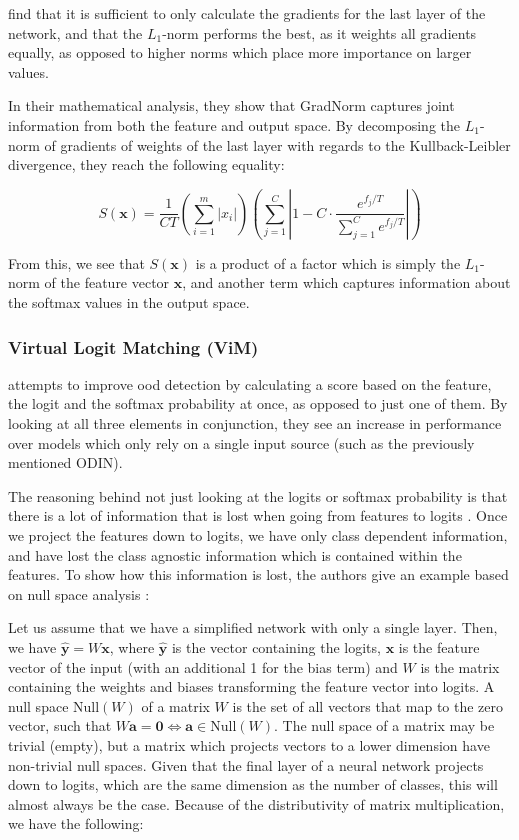 \documentclass[UKenglish]{uiomasterthesis} %
\theoremstyle{definition}
\begin{document}
\cite{gradnorm} find that it is sufficient to only calculate the gradients for the last layer of the network, and that the $L_1$-norm performs the best, as it weights all gradients equally, as opposed to higher norms which place more importance on larger values.

In their mathematical analysis, they show that GradNorm captures joint information from both the feature and output space. By decomposing the $L_1$-norm of gradients of weights of the last layer with regards to the Kullback-Leibler divergence, they reach the following equality:

\begin{equation}
S(\bm{x}) = \frac{1}{CT}  \left(\sum_{i=1}^m |x_i|\right) \left(\sum_{j=1}^C \left|1 - C \cdot \frac{e^{f_j / T}}{\sum_{j=1}^C e^{{f_{j}} / T}}\right|\right)
\label{eq:decomp}
\end{equation}

From this, we see that $S(\bm{x})$ is a product of a factor which is simply the $L_1$-norm of the feature vector $\bm{x}$, and another term which captures information about the softmax values in the output space.
\\


\subsubsection{Virtual Logit Matching (ViM)} \label{section:vim}

\cite{vim} attempts to improve \ac{ood} detection by calculating a score based on the feature, the logit and the softmax probability at once, as opposed to just one of them. By looking at all three elements in conjunction, they see an increase in performance over models which only rely on a single input source (such as the previously mentioned ODIN).

The reasoning behind not just looking at the logits or softmax probability is that there is a lot of information that is lost when going from features to logits \cite{vim}. Once we project the features down to logits, we have only class dependent information, and have lost the class agnostic information which is contained within the features. To show how this information is lost, the authors give an example based on null space analysis \cite{nusa}:

Let us assume that we have a simplified network with only a single layer. Then, we have $\hat{\bm{y}} = W \bm{x}$, where $\hat{\bm{y}}$ is the vector containing the logits, $\bm{x}$ is the feature vector of the input (with an additional 1 for the bias term) and $W$ is the matrix containing the weights and biases transforming the feature vector into logits. A null space $\text{Null}(W)$ of a matrix $W$ is the set of all vectors that map to the zero vector, such that $W \bm{a} = \bm{0} \iff \bm{a} \in \text{Null}(W)$. The null space of a matrix may be trivial (empty), but a matrix which projects vectors to a lower dimension have non-trivial null spaces. Given that the final layer of a neural network projects down to logits, which are the same dimension as the number of classes, this will almost always be the case. Because of the distributivity of matrix multiplication, we have the following:
\end{document}
